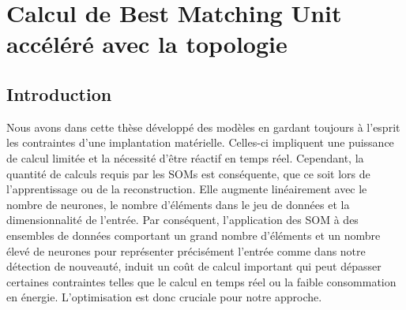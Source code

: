 
\chapter{Calcul de Best Matching Unit accéléré avec la topologie}
	\minitoc
	\newpage




	\section{Introduction}

	Nous avons dans cette thèse développé des modèles en gardant toujours à l'esprit les contraintes d'une implantation matérielle. Celles-ci impliquent une puissance de calcul limitée et la nécessité d'être réactif en temps réel. Cependant, la quantité de calculs requis par les SOMs est conséquente, que ce soit lors de l'apprentissage ou de la reconstruction. Elle augmente linéairement avec le nombre de neurones, le nombre d'éléments dans le jeu de données et la dimensionnalité de l'entrée. Par conséquent, l'application des SOM à des ensembles de données comportant un grand nombre d'éléments et un nombre élevé de neurones pour représenter précisément l'entrée comme dans notre détection de nouveauté, induit un coût de calcul important qui peut dépasser certaines contraintes telles que le calcul en temps réel ou la faible consommation en énergie. L'optimisation est donc cruciale pour notre approche.

